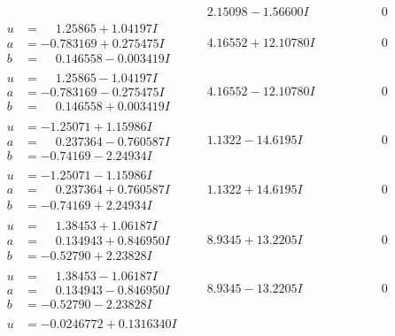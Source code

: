 \documentclass[1p]{elsarticle_modified}
\theoremstyle{definition}
\begin{document}
$$\begin{array}{c|c|c}
 & \phantom{-}2.15098 - 1.56600 I & \phantom{-0.000000 } 0 \\ \hline\begin{aligned}
u &= \phantom{-}1.25865 + 1.04197 I \\
a &= -0.783169 + 0.275475 I \\
b &= \phantom{-}0.146558 - 0.003419 I\end{aligned}
 & \phantom{-}4.16552 + 12.10780 I & \phantom{-0.000000 } 0 \\ \hline\begin{aligned}
u &= \phantom{-}1.25865 - 1.04197 I \\
a &= -0.783169 - 0.275475 I \\
b &= \phantom{-}0.146558 + 0.003419 I\end{aligned}
 & \phantom{-}4.16552 - 12.10780 I & \phantom{-0.000000 } 0 \\ \hline\begin{aligned}
u &= -1.25071 + 1.15986 I \\
a &= \phantom{-}0.237364 - 0.760587 I \\
b &= -0.74169 - 2.24934 I\end{aligned}
 & \phantom{-}1.1322 - 14.6195 I & \phantom{-0.000000 } 0 \\ \hline\begin{aligned}
u &= -1.25071 - 1.15986 I \\
a &= \phantom{-}0.237364 + 0.760587 I \\
b &= -0.74169 + 2.24934 I\end{aligned}
 & \phantom{-}1.1322 + 14.6195 I & \phantom{-0.000000 } 0 \\ \hline\begin{aligned}
u &= \phantom{-}1.38453 + 1.06187 I \\
a &= \phantom{-}0.134943 + 0.846950 I \\
b &= -0.52790 + 2.23828 I\end{aligned}
 & \phantom{-}8.9345 + 13.2205 I & \phantom{-0.000000 } 0 \\ \hline\begin{aligned}
u &= \phantom{-}1.38453 - 1.06187 I \\
a &= \phantom{-}0.134943 - 0.846950 I \\
b &= -0.52790 - 2.23828 I\end{aligned}
 & \phantom{-}8.9345 - 13.2205 I & \phantom{-0.000000 } 0 \\ \hline\begin{aligned}
u &= -0.0246772 + 0.1316340 I \\

\end{aligned}
\end{array}$$
\end{document}
